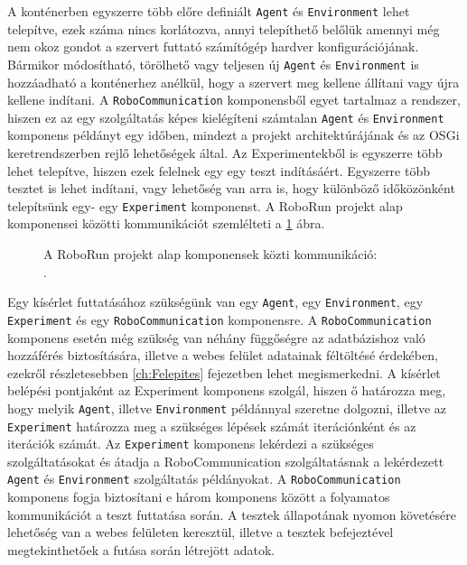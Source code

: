 	 A konténerben egyszerre több előre definiált \texttt{Agent} és \texttt{Environment} lehet telepítve, ezek száma nincs korlátozva, annyi telepíthető belőlük amennyi még nem okoz gondot a szervert futtató számítógép hardver konfigurációjának. Bármikor módosítható, törölhető vagy teljesen új \texttt{Agent} és \texttt{Environment} is hozzáadható a konténerhez anélkül, hogy a szervert meg kellene állítani vagy újra kellene indítani. A \texttt{RoboCommunication} komponensből egyet tartalmaz a rendszer, hiszen ez az egy szolgáltatás képes kielégíteni számtalan \texttt{Agent} és \texttt{Environment} komponens példányt egy időben, mindezt a projekt architektúrájának és az OSGi keretrendszerben rejlő lehetőségek által. Az Experimentekből is egyszerre több lehet telepítve, hiszen ezek felelnek egy egy teszt indításáért. Egyszerre több tesztet is lehet indítani, vagy lehetőség van arra is, hogy különböző időközönként telepítsünk egy- egy \texttt{Experiment} komponenst. A RoboRun projekt alap komponensei közötti kommunikációt szemlélteti a \ref{fig:OsgiAlap} ábra.

\begin{figure}[h!]
  \centering
  \caption[RoboRun alap komponensek]%
  {A RoboRun projekt alap komponensek közti kommunikáció:\\
  {\white .}\hfill\url{}}
  \label{fig:OsgiAlap}
\end{figure}


Egy kísérlet futtatásához szükségünk van egy \texttt{Agent}, egy \texttt{Environment}, egy \texttt{Experiment} és egy \texttt{RoboCommunication} komponensre. A \texttt{RoboCommunication} komponens esetén még szükség van néhány függőségre az adatbázishoz való hozzáférés biztosítására, illetve a webes felület adatainak féltöltésé érdekében, ezekről részletesebben \ref{ch:Felepites} fejezetben lehet megismerkedni. A kísérlet belépési pontjaként az Experiment komponens szolgál, hiszen ő határozza meg, hogy melyik \texttt{Agent}, illetve \texttt{Environment} példánnyal szeretne dolgozni, illetve az \texttt{Experiment} határozza meg a szükséges lépések számát iterációnként és az iterációk számát. Az \texttt{Experiment} komponens lekérdezi a szükséges szolgáltatásokat és átadja a RoboCommunication szolgáltatásnak a lekérdezett \texttt{Agent} és \texttt{Environment} szolgáltatás példányokat. A \texttt{RoboCommunication} komponens fogja biztosítani e három komponens között a folyamatos kommunikációt a teszt futtatása során. A tesztek állapotának nyomon követésére lehetőség van a webes felületen keresztül, illetve a tesztek befejeztével megtekinthetőek a futása során létrejött adatok.

